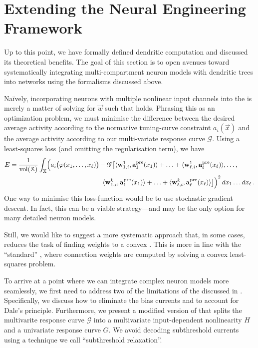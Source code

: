 
\section{Extending the Neural Engineering Framework}
\label{sec:nef_extension}

Up to this point, we have formally defined dendritic computation and discussed its theoretical benefits.
The goal of this section is to open avenues toward systematically integrating multi-compartment neuron models with dendritic trees into \NEF networks using the formalisms discussed above.

Na\"ively, incorporating neurons with multiple nonlinear input channels into the \NEF is merely a matter of solving for $\vec w$ such that  holds.
Phrasing this as an optimization problem, we must minimise the difference between the desired average activity according to the normative tuning-curve constraint $a_i(\vec x)$ and the average activity according to our multi-variate response curve $\mathscr{G}$.
Using a least-squares loss (and omitting the regularisation term), we have
\begin{align}
	\begin{aligned}
	E &=
	\frac{1}{\vol(\Xrepr)} \int_{\Xrepr} \Bigl( a_i\bigl(\phi(x_1, \ldots, x_\ell)\bigr) -
	\mathscr{G} \bigl[
		\langle \vec w_{1, i}^1, \vec a^\mathrm{pre}_1(x_1) \rangle + \ldots +
		\langle \vec w_{\ell, i}^1, \vec a^\mathrm{pre}_\ell(x_\ell) \rangle, \ldots,\\
	&~\hspace{13.825em}
		\langle \vec w_{1, i}^k, \vec a^\mathrm{pre}_1(x_1) \rangle + \ldots +
		\langle \vec w_{\ell, i}^k, \vec a^\mathrm{pre}_\ell(x_\ell) \rangle
	\bigr] \Bigr)^2 \,dx_1 \ldots dx_\ell \,.
	\end{aligned}
	\label{eqn:dendritic_computation_optimisation}
\end{align}
One way to minimise this loss-function would be to use stochastic gradient descent.
In fact, this can be a viable strategy---and may be the only option for many detailed neuron models.

Still, we would like to suggest a more systematic approach that, in some cases, reduces the task of finding weights to a convex \qprog.
This is more in line with the \enquote{standard} \NEF, where connection weights are computed by solving a convex least-squares problem.

To arrive at a point where we can integrate complex neuron models more seamlessly, we first need to address two of the limitations of the \NEF discussed in .
Specifically, we discuss how to eliminate the bias currents and to account for Dale's principle.
Furthermore, we present a modified version of  that splits the multivarite response curve $\mathscr{G}$ into a multivariate input-dependent nonlinearity $H$ and a univariate response curve $G$.
We avoid decoding subthreshold currents using a technique we call \enquote{subthreshold relaxation}.

